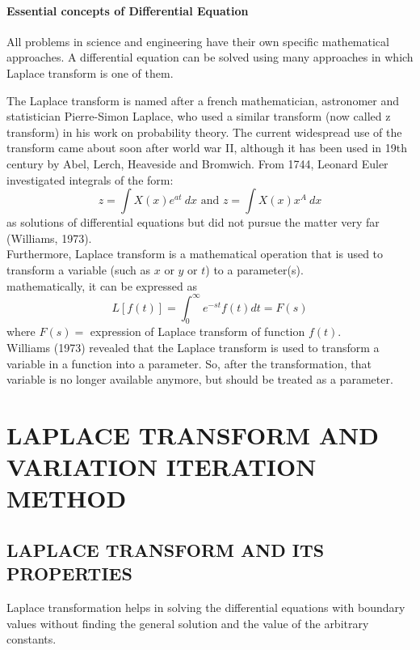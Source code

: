 \documentclass[12pt]{report}
\begin{document}
\subsubsection{Essential concepts of Differential Equation}
\qquad All problems in science and engineering have their own specific mathematical approaches. A differential equation can be solved using many approaches in which Laplace transform is one of them. \\
\newpage
\par The Laplace transform is named after a french mathematician, astronomer and statistician Pierre-Simon Laplace, who used a similar transform (now called z transform) in his work on probability theory. The current widespread use of the transform came about soon after world war II, although it has been used in 19th century by Abel, Lerch, Heaveside and Bromwich. From 1744, Leonard Euler investigated integrals of the form:
\begin{equation}
z=\int X(x)e^{at}~dx \mbox{ and } z=\int X(x)x^A~dx
\end{equation}
as solutions of differential equations but did not pursue the matter very far (Williams, 1973).\\

Furthermore, Laplace transform is a mathematical operation that is used to transform a variable (such as $x \mbox{ or } y \mbox{ or } t$) to a parameter(s). \\
mathematically, it can be expressed as
\begin{equation}
L[f(t)]=\int_0^\infty e^{-st} f(t)dt=F(s)
\end{equation}
where $F(s)=$ expression of Laplace transform of function $f(t)$. \\
Williams (1973) revealed that the Laplace transform is used to transform a variable in a function into a parameter. So, after the transformation, that variable is no longer available anymore, but should be treated as a parameter.
\chapter{LAPLACE TRANSFORM AND VARIATION ITERATION METHOD}
\section{LAPLACE TRANSFORM AND ITS PROPERTIES}
\par Laplace transformation helps in solving the differential equations with boundary values without finding the general solution and the value of the arbitrary constants.
\end{document}
